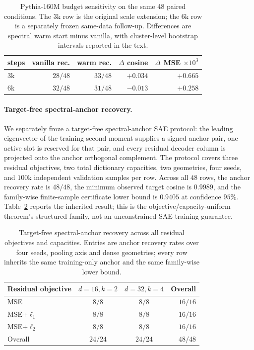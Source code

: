 \documentclass{article}
\theoremstyle{plain}
\begin{document}
{\begin{table}[H]
\caption{Pythia-160M budget sensitivity on the same 48 paired conditions. The 3k row is the original scale extension; the 6k row is a separately frozen same-data follow-up. Differences are spectral warm start minus vanilla, with cluster-level bootstrap intervals reported in the text.}
\label{tab:scale_budget}
\begin{center}
\scriptsize
\setlength{\tabcolsep}{6pt}
\begin{tabular}{@{}lrrrr@{}}
\toprule
steps & vanilla rec. & warm rec. & $\Delta$ cosine & $\Delta$ MSE $\times 10^3$ \\
\midrule
$3$k & $28/48$ & $33/48$ & $+0.034$ & $+0.665$ \\
$6$k & $32/48$ & $31/48$ & $-0.013$ & $+0.258$ \\
\bottomrule
\end{tabular}
\end{center}
\end{table}

\paragraph{Target-free spectral-anchor recovery.} We separately froze a target-free spectral-anchor SAE protocol: the leading eigenvector of the training second moment supplies a signed anchor pair, one active slot is reserved for that pair, and every residual decoder column is projected onto the anchor orthogonal complement. The protocol covers three residual objectives, two total dictionary capacities, two geometries, four seeds, and $100$k independent validation samples per row. Across all $48$ rows, the anchor recovery rate is $48/48$, the minimum observed target cosine is $0.9989$, and the family-wise finite-sample certificate lower bound is $0.9405$ at confidence $95\%$. Table~\ref{tab:spectral_anchor} reports the inherited result; this is the objective/capacity-uniform theorem's structured family, not an unconstrained-SAE training guarantee.

\begin{table}[H]
\caption{Target-free spectral-anchor recovery across all residual objectives and capacities. Entries are anchor recovery rates over four seeds, pooling axis and dense geometries; every row inherits the same training-only anchor and the same family-wise lower bound.}
\label{tab:spectral_anchor}
\begin{center}
\scriptsize
\begin{tabular}{@{}lccr@{}}
\toprule
Residual objective & $d{=}16,k{=}2$ & $d{=}32,k{=}4$ & Overall \\
\midrule
MSE & $8/8$ & $8/8$ & $16/16$ \\
MSE+$\ell_1$ & $8/8$ & $8/8$ & $16/16$ \\
MSE+$\ell_2$ & $8/8$ & $8/8$ & $16/16$ \\
\midrule
Overall & $24/24$ & $24/24$ & $48/48$ \\
\bottomrule
\end{tabular}
\end{center}
\end{table}

}
\end{document}
